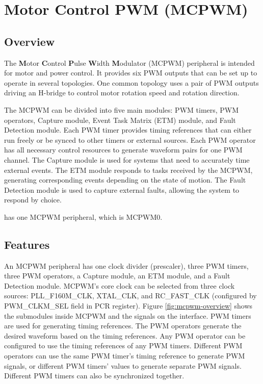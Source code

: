 \documentclass[main\_\_EN.tex]{subfiles}
\begin{document}

\ifglobal
\else
    {\let\clearpage\relax \listoftodos}
    \tableofcontents
\fi


\hypertarget{mcpwm}{}
\chapter{Motor Control PWM (MCPWM)}
\label{mod:mcpwm}


\section{Overview}

The \textbf{M}otor \textbf{C}ontrol \textbf{P}ulse \textbf{W}idth \textbf{M}odulator (MCPWM) peripheral is intended for motor and power control. It provides six PWM outputs that can be set up to operate in several topologies. One common topology uses a pair of PWM outputs driving an H-bridge to control motor rotation speed and rotation direction.

The MCPWM can be divided into five main modules: PWM timers, PWM operators, Capture module, Event Task Matrix (ETM) module, and Fault Detection module. Each PWM timer provides timing references that can either run freely or be synced to other timers or external sources. Each PWM operator has all necessary control resources to generate waveform pairs for one PWM channel. The Capture module is used for systems that need to accurately time external events. The ETM module responds to tasks received by the MCPWM, generating corresponding events depending on the state of motion. The Fault Detection module is used to capture external faults, allowing the system to respond by choice.

\chipname{} has one MCPWM peripheral, which is MCPWM0.

\section{Features}
An MCPWM peripheral has one clock divider (prescaler), three PWM timers, three PWM operators, a Capture module, an ETM module, and a Fault Detection module. MCPWM's core clock can be selected from three clock sources: PLL\_F160M\_CLK, XTAL\_CLK, and RC\_FAST\_CLK (configured by PWM\_CLKM\_SEL field in PCR register). Figure \ref{fig:mcpwm-overview} shows the submodules inside MCPWM and the signals on the interface. PWM timers are used for generating timing references. The PWM operators generate the desired waveform based on the timing references. Any PWM operator can be configured to use the timing references of any PWM timers. Different PWM operators can use the same PWM timer's timing reference to generate PWM signals, or different PWM timers' values to generate separate PWM signals. Different PWM timers can also be synchronized together.
\end{document}

